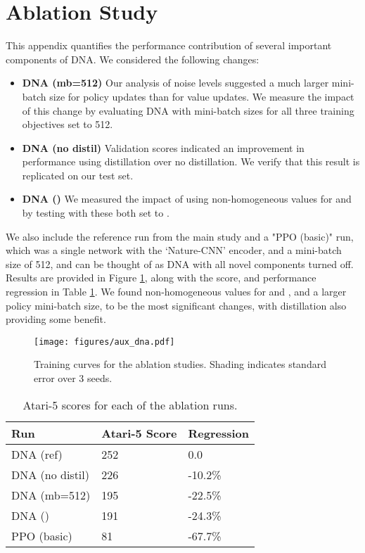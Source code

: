 \documentclass{article}
\begin{document}
\clearpage

\section{Ablation Study}
\label{app:ablation}

This appendix quantifies the performance contribution of several important components of DNA. We considered the following changes:

\begin{itemize}
    \item \textbf{DNA (mb=512)} Our analysis of noise levels suggested a much larger mini-batch size for policy updates than for value updates. We measure the impact of this change by evaluating DNA with mini-batch sizes for all three training objectives set to 512. 
    \item \textbf{DNA (no distil)}    
    Validation scores indicated an improvement in performance using distillation over no distillation. We verify that this result is replicated on our test set. 
    \item \textbf{DNA ()} We measured the impact of using non-homogeneous values for  and  by testing with these both set to . 
\end{itemize}

We also include the reference run from the main study and a "PPO (basic)" run, which was a single network with the `Nature-CNN' encoder, and a mini-batch size of 512, and can be thought of as DNA with all novel components turned off. Results are provided in Figure \ref{fig:abl_results}, along with the score, and performance regression in Table \ref{tab:abl_results}. We found non-homogeneous values for  and , and a larger policy mini-batch size, to be the most significant changes, with distillation also providing some benefit. 

\begin{figure}[t]
    \centering
    \texttt{[image: figures/aux\_dna.pdf]}
    \caption{Training curves for the ablation studies. Shading indicates standard error over 3 seeds.}
    \label{fig:abl_results}
\end{figure}

\begin{table}[h]
    \caption{Atari-5 scores for each of the ablation runs.}
    \label{tab:abl_results}
    \centering
    \begin{tabular}{l l l}
    \toprule
        Run & Atari-5 Score & Regression \\
    \midrule
         DNA (ref) & 252 & 0.0 \\
         DNA (no distil) & 226 & -10.2\% \\
         DNA (mb=512) & 195 & -22.5\% \\
         DNA () & 191 & -24.3\% \\
         PPO (basic) & 81 & -67.7\% \\
    \bottomrule
    \end{tabular}
    
\end{table}
\end{document}

